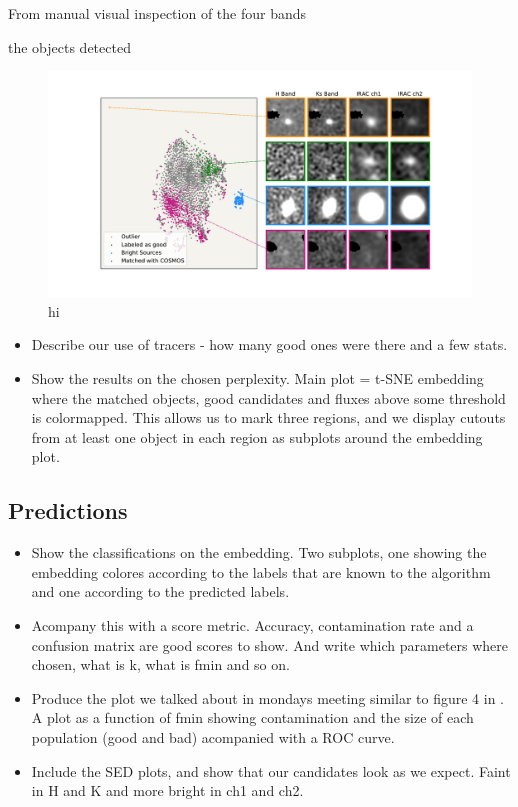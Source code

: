 From manual visual inspection of the four bands 

the objects detected

\begin{figure}[]
    \centering %
    \includegraphics[trim={0cm 0cm 0cm 0cm},clip,width=\textwidth]{Code/Saved_Figures/Visual_inspection_embedding.pdf}
    \caption{hi}
    \label{embedding_regions}
\end{figure}

\begin{itemize}
    \item Describe our use of tracers - how many good ones were there and a few stats.
    \item Show the results on the chosen perplexity. Main plot = t-SNE embedding where the matched objects, good candidates and fluxes above some threshold is colormapped. This allows us to mark three regions, and we display cutouts from at least one object in each region as subplots around the embedding plot.
\end{itemize}

\subsection{Predictions}
\begin{itemize}
    \item Show the classifications on the embedding. Two subplots, one showing the embedding colores according to the labels that are known to the algorithm and one according to the predicted labels.
    \item Acompany this with a score metric. Accuracy, contamination rate and a confusion matrix are good scores to show. And write which parameters where chosen, what is k, what is fmin and so on.
    \item Produce the plot we talked about in mondays meeting similar to figure 4 in \cite{Steinhardt_2020}. A plot as a function of fmin showing contamination and the size of each population (good and bad) acompanied with a ROC curve.
    \item Include the SED plots, and show that our candidates look as we expect. Faint in H and K and more bright in ch1 and ch2.
\end{itemize}


